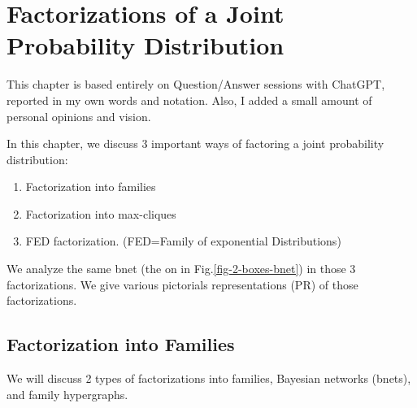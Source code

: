 \chapter{Factorizations of a Joint Probability Distribution}
\label{ch-factor-joint-prob}

This chapter is based
entirely on Question/Answer sessions with ChatGPT, reported in my own words and notation.
Also, I added a small amount of personal opinions and vision.

In this chapter, we discuss 3 important
ways of factoring a joint probability distribution:
\begin{enumerate}
\item Factorization into families
\item Factorization into max-cliques
\item FED factorization. (FED=Family
of exponential Distributions)

\end{enumerate}
We analyze the same bnet (the on in Fig.\ref{fig-2-boxes-bnet})
in those 3 factorizations. We give
various pictorials representations (PR) of those factorizations.

\section{Factorization into Families}

We will discuss 2 types of factorizations
into families,
Bayesian networks (bnets),
and family hypergraphs.




